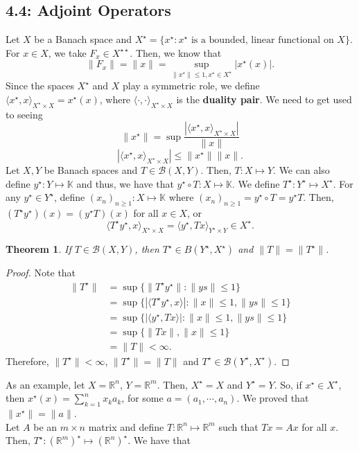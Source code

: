 \documentclass[12pt]{article}
\newtheorem{theorem}{Theorem}
\newcommand{\R}{{\mathbb R}}
\def\K{\mathbb{K}}
\newcommand{\B}{\mathscr{B}}
\newcommand{\la}{\langle}
\newcommand{\ra}{\rangle}
\newcommand{\xs}{(x_n)_{n \geq 1} }
\newcommand{\Xs}{X^{\star}}
\newcommand{\Xss}{X^{\star \star}}
\newcommand{\xst}{x^{\star}}
\newcommand{\Ts}{T^{\star}}
\newcommand{\Ys}{Y^{\star}}
\newcommand{\ys}{y^{\star}}
\begin{document}
\subsection*{4.4: Adjoint Operators}
Let $X$ be a Banach space and $\Xs = \{ \xst : \xst \text{ is a bounded, linear functional on } X \}$. For $x \in X$, we take $F_x \in \Xss$. Then, we know that 
\[ \| F_x \| = \| x \| = \sup\limits_{\| \xst \| \leq 1, \xst \in \Xs} |\xst(x)|.\]
Since the spaces $\Xs$ and $X$ play a symmetric role, we define $\la \xst, x \ra_{\Xs \times X} = \xst(x)$, where $\la \cdot, \cdot \ra_{\Xs \times X}$ is the \textbf{duality pair}. We need to get used to seeing 
\[ \| \xst \| = \sup\frac{|\la \xst, x \ra_{\Xs \times X}|}{\| x \|} \]
\[|\la \xst, x \ra_{\Xs \times X}| \leq \| \xst \| \| x \|. \]
Let $X, Y$ be Banach spaces and $T \in \B(X, Y)$. Then, $T: X \mapsto Y$. We can also define $y^{\star}: Y \mapsto \K$ and thus, we have that $y^{\star} \circ T: X \mapsto \K$. We define $T^{\star}: \Ys \mapsto \Xs$. For any $\ys \in \Ys$, define $\xs: X \mapsto \K$ where $\xs = \ys \circ T= \ys T$. Then, $(\Ts \ys)(x) = (\ys T)(x)$ for all $x \in X$, or 
\[ \la \Ts \ys, x \ra_{\Xs \times X} = \la \ys, Tx \ra_{\Ys \times Y} \in \Xs. \]
\begin{theorem}
If $T \in \B(X, Y)$, then $\Ts \in B(\Ys, \Xs)$ and $\| T \| = \| \Ts \|$. 
\end{theorem}
\vspace{-25pt}
\begin{proof}
Note that 
\begin{align*}
\| \Ts \| & = \sup \{ \| \Ts \ys \| : \| ys \| \leq 1\} \\
&  = \sup \{ | \la \Ts \ys, x \ra|: \| x \| \leq 1, \| ys \| \leq 1\}\\
& = \sup \{ | \la \ys, Tx \ra|: \| x \| \leq 1, \| ys \| \leq 1\}\\
&  = \sup \{\| Tx \|, \| x \| \leq 1\}\\
& = \| T \| < \infty. 
\end{align*}
Therefore, $\| \Ts \| < \infty$, $\| \Ts \| = \| T \|$ and $\Ts \in \B(\Ys, \Xs)$. 
\end{proof}
As an example, let $X =\R^n$, $Y = \R^m$. Then, $\Xs = X$ and $\Ys = Y$. So, if $\xst \in \Xs$, then $\xst (x) = \sum\limits_{k = 1}^n x_k a_k$, for some $a = (a_1, \cdots, a_n)$. We proved that $\| \xst \| = \| a\|$. \\ 
\indent Let $A$ be an $m \times n$ matrix and define $T: \R^n \mapsto \R^m$ such that $Tx = Ax$ for all $x$. Then, $\Ts: \left( \R^m \right)^{\star} \mapsto \left( \R^n \right)^{\star}$. We have that 
\end{document}
